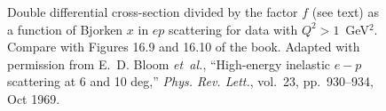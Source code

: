 \documentclass[a4paper,10pt]{article}
\begin{document}
\begin{figure}[htb]
\begin{center}
\caption{Double differential cross-section divided by the factor $f$ (see text) as a function
of Bjorken $x$ in $ep$ scattering for data with $Q^2>1$~GeV$^2$.
Compare with Figures 16.9 and 16.10 of the book.
Adapted with permission from
E.~D. Bloom {\em et~al.}, ``High-energy inelastic $e\ensuremath{-}p$ scattering
  at 6 and 10 deg,'' {\em Phys. Rev. Lett.}, vol.~23, pp.~930--934, Oct 1969.}
\end{center}
\end{figure}
%
\end{document}
